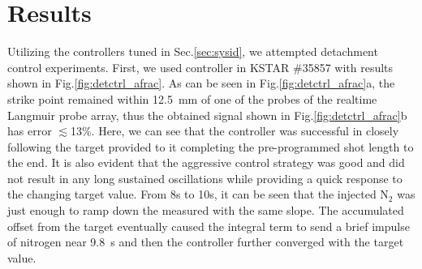 \section{Results}
\label{sec:results}





Utilizing the controllers tuned in Sec.\ref{sec:sysid}, we attempted detachment control experiments.
First, we used \Afrac controller in KSTAR \#35857 with results shown in Fig.\ref{fig:detctrl_afrac}.
As can be seen in Fig.\ref{fig:detctrl_afrac}a, the strike point remained within 12.5~mm of one of the probes of the realtime Langmuir probe array, thus the obtained \Afrac signal shown in Fig.\ref{fig:detctrl_afrac}b has error $\lesssim$13\%.
Here, we can see that the controller was successful in closely following the target provided to it completing the pre-programmed shot length to the end.
It is also evident that the aggressive control strategy was good and did not result in any long sustained oscillations while providing a quick response to the changing target value.
From 8s to 10s, it can be seen that the injected N$_2$ was just enough to ramp down the measured \Afrac with the same slope.
The accumulated offset from the target eventually caused the integral term to send a brief impulse of nitrogen near 9.8~s and then the controller further converged with the target value.

